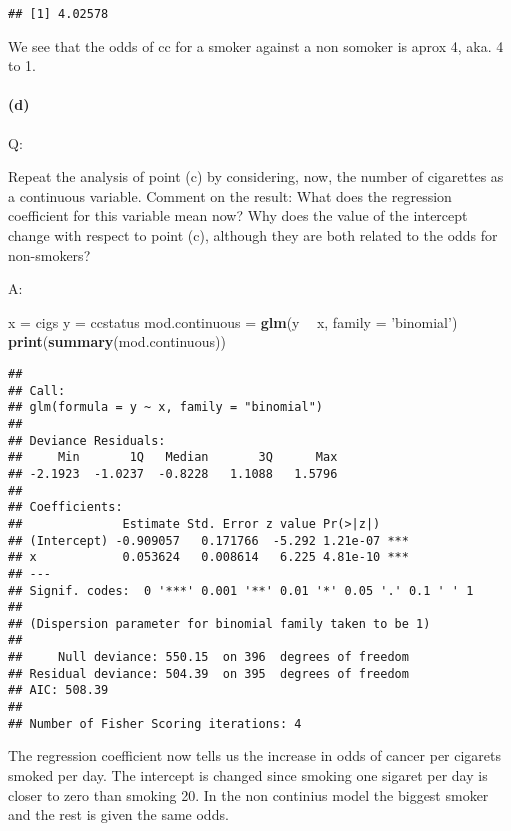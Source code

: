 \documentclass[
]{article}
\newenvironment{Shaded}{\begin{snugshade}}{\end{snugshade}}
\newcommand{\DataTypeTok}[1]{\textcolor[rgb]{0.13,0.29,0.53}{#1}}
\newcommand{\KeywordTok}[1]{\textcolor[rgb]{0.13,0.29,0.53}{\textbf{#1}}}
\newcommand{\NormalTok}[1]{#1}
\newcommand{\OperatorTok}[1]{\textcolor[rgb]{0.81,0.36,0.00}{\textbf{#1}}}
\newcommand{\StringTok}[1]{\textcolor[rgb]{0.31,0.60,0.02}{#1}}
\begin{document}
\begin{verbatim}
## [1] 4.02578
\end{verbatim}

We see that the odds of cc for a smoker against a non somoker is aprox
4, aka. 4 to 1.

\hypertarget{d}{%
\paragraph{(d)}\label{d}}

Q:

Repeat the analysis of point (c) by considering, now, the number of
cigarettes as a continuous variable. Comment on the result: What does
the regression coefficient for this variable mean now? Why does the
value of the intercept change with respect to point (c), although they
are both related to the odds for non-smokers?

A:

\begin{Shaded}
\begin{Highlighting}[]
\NormalTok{x =}\StringTok{ }\NormalTok{cigs}
\NormalTok{y =}\StringTok{ }\NormalTok{ccstatus}
\NormalTok{mod.continuous =}\StringTok{ }\KeywordTok{glm}\NormalTok{(y }\OperatorTok{~}\StringTok{ }\NormalTok{x, }\DataTypeTok{family =} \StringTok{'binomial'}\NormalTok{)}
\KeywordTok{print}\NormalTok{(}\KeywordTok{summary}\NormalTok{(mod.continuous))}
\end{Highlighting}
\end{Shaded}

\begin{verbatim}
## 
## Call:
## glm(formula = y ~ x, family = "binomial")
## 
## Deviance Residuals: 
##     Min       1Q   Median       3Q      Max  
## -2.1923  -1.0237  -0.8228   1.1088   1.5796  
## 
## Coefficients:
##              Estimate Std. Error z value Pr(>|z|)    
## (Intercept) -0.909057   0.171766  -5.292 1.21e-07 ***
## x            0.053624   0.008614   6.225 4.81e-10 ***
## ---
## Signif. codes:  0 '***' 0.001 '**' 0.01 '*' 0.05 '.' 0.1 ' ' 1
## 
## (Dispersion parameter for binomial family taken to be 1)
## 
##     Null deviance: 550.15  on 396  degrees of freedom
## Residual deviance: 504.39  on 395  degrees of freedom
## AIC: 508.39
## 
## Number of Fisher Scoring iterations: 4
\end{verbatim}

The regression coefficient now tells us the increase in odds of cancer
per cigarets smoked per day. The intercept is changed since smoking one
sigaret per day is closer to zero than smoking 20. In the non continius
model the biggest smoker and the rest is given the same odds.
\end{document}
